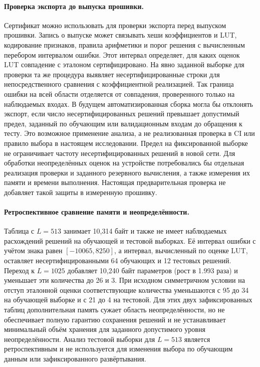 \paragraph{Проверка экспорта до выпуска прошивки.}
Сертификат можно использовать для проверки экспорта перед выпуском прошивки.
Запись о выпуске может связывать хеши коэффициентов и LUT, кодирование
признаков, правила арифметики и порог решения с вычисленным перебором
интервалом ошибки. Этот интервал определяет, для каких оценок LUT
совпадение с эталоном сертифицировано. На явно заданной выборке для проверки
та же процедура выявляет несертифицированные строки для непосредственного
сравнения с коэффициентной реализацией. Так граница ошибки на всей области
отделяется от совпадения, проверенного только на наблюдаемых входах.
В будущем автоматизированная сборка могла бы отклонять экспорт, если число
несертифицированных решений превышает допустимый предел, заданный по
обучающим или валидационным входам до обращения к тесту. Это возможное
применение анализа, а не реализованная проверка в CI или правило выбора
в настоящем исследовании. Предел на фиксированной выборке не ограничивает
частоту несертифицированных решений в новой сети. Для обработки
неопределённых оценок на устройстве потребовались бы отдельная реализация
проверки и заданного резервного вычисления, а также измерения их памяти
и времени выполнения. Настоящая предварительная проверка не добавляет
такой защиты в измеренную прошивку.

\paragraph{Ретроспективное сравнение памяти и неопределённости.}
Таблица с $L=513$ занимает 10,314 байт и также не имеет наблюдаемых
расхождений решений на обучающей и тестовой выборках. Её интервал ошибки
с учётом знака равен $[-10065,8250]$, а интервал, вычисленный по оценке LUT,
оставляет несертифицированными 64 обучающих и 12 тестовых решений.
Переход к $L=1025$ добавляет 10,240 байт параметров (рост в
1.993 раза) и уменьшает эти количества до 26 и 3. При исходном
симметричном условии на отступ эталонной оценки соответствующие
количества уменьшаются с 95 до 34 на обучающей выборке и с 21 до 4
на тестовой. Для этих двух зафиксированных таблиц дополнительная память
сужает область неопределённости, но не обеспечивает полную гарантию
сохранения решений и не устанавливает минимальный объём хранения
для заданного допустимого уровня неопределённости.
Анализ тестовой выборки для $L=513$ является ретроспективным и не
используется для изменения выбора по обучающим данным или
зафиксированного развёртывания.
